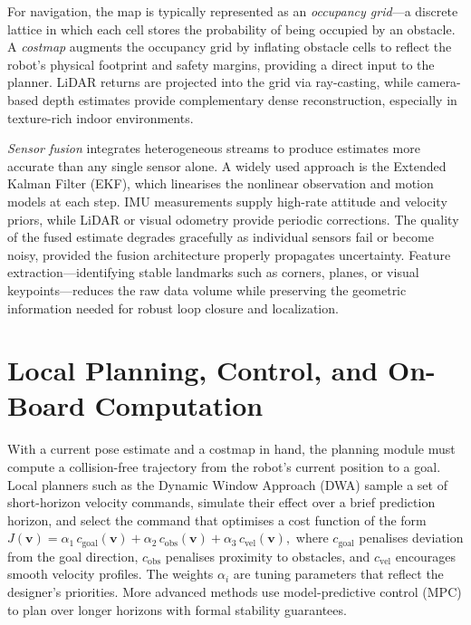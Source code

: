 For navigation, the map is typically represented as an \emph{occupancy grid}---a
discrete lattice in which each cell stores the probability of being occupied by an
obstacle.
A \emph{costmap} augments the occupancy grid by inflating obstacle cells to reflect the
robot's physical footprint and safety margins, providing a direct input to the planner.
LiDAR returns are projected into the grid via ray-casting, while camera-based depth
estimates provide complementary dense reconstruction, especially in texture-rich indoor
environments.

\emph{Sensor fusion} integrates heterogeneous streams to produce estimates more accurate
than any single sensor alone.
A widely used approach is the Extended Kalman Filter (EKF), which linearises the nonlinear
observation and motion models at each step.
IMU measurements supply high-rate attitude and velocity priors, while LiDAR or visual
odometry provide periodic corrections.
The quality of the fused estimate degrades gracefully as individual sensors fail or
become noisy, provided the fusion architecture properly propagates uncertainty.
Feature extraction---identifying stable landmarks such as corners, planes, or visual
keypoints---reduces the raw data volume while preserving the geometric information
needed for robust loop closure and localization.

\section{Local Planning, Control, and On-Board Computation}

With a current pose estimate and a costmap in hand, the planning module must compute
a collision-free trajectory from the robot's current position to a goal.
Local planners such as the Dynamic Window Approach (DWA) sample a set of short-horizon
velocity commands, simulate their effect over a brief prediction horizon, and select the
command that optimises a cost function of the form
\(
  J(\mathbf{v}) = \alpha_1 \, c_{\text{goal}}(\mathbf{v})
                + \alpha_2 \, c_{\text{obs}}(\mathbf{v})
                + \alpha_3 \, c_{\text{vel}}(\mathbf{v}),
\)
where \(c_{\text{goal}}\) penalises deviation from the goal direction, \(c_{\text{obs}}\)
penalises proximity to obstacles, and \(c_{\text{vel}}\) encourages smooth velocity
profiles.
The weights \(\alpha_i\) are tuning parameters that reflect the designer's priorities.
More advanced methods use model-predictive control (MPC) to plan over longer horizons
with formal stability guarantees.

